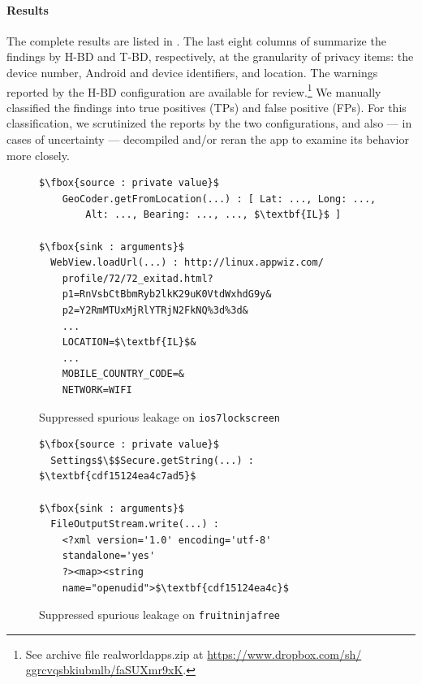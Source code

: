 \paragraph{Results} The complete results are listed in . The last eight columns of  summarize the findings by H-BD and T-BD, respectively, at the granularity of privacy items: the device number, Android and device identifiers, and location. 
%
%
The warnings reported by the H-BD configuration are available for review.\footnote{
	See archive file realworldapps.zip at \href{https://www.dropbox.com/sh/ggrcvqsbkiubmlb/faSUXmr9xK}{https://www.dropbox.com/sh/
	ggrcvqsbkiubmlb/faSUXmr9xK}.
}
%
We manually classified the findings into true positives (TPs) and false positive (FPs). For this classification, we scrutinized the reports by the two configurations, and also --- in cases of uncertainty --- decompiled and/or reran the app to examine its behavior more closely. 

\begin{figure}
\begin{minipage}[b]{0.95\columnwidth}
\begin{lstlisting}
$\fbox{source : private value}$
    GeoCoder.getFromLocation(...) : [ Lat: ..., Long: ..., 
	    Alt: ..., Bearing: ..., ..., $\textbf{IL}$ ] 
	    
$\fbox{sink : arguments}$
  WebView.loadUrl(...) : http://linux.appwiz.com/
    profile/72/72_exitad.html?
    p1=RnVsbCtBbmRyb2lkK29uK0VtdWxhdG9y&
    p2=Y2RmMTUxMjRlYTRjN2FkNQ%3d%3d&
    ...    
    LOCATION=$\textbf{IL}$&
    ...
    MOBILE_COUNTRY_CODE=&
    NETWORK=WIFI
\end{lstlisting}
\caption{\label{Fi:ios7}Suppressed spurious leakage on {\tt ios7lockscreen}}
\end{minipage}
\hfill
\begin{minipage}[b]{0.95\columnwidth}
\begin{lstlisting}
$\fbox{source : private value}$
  Settings$\$$Secure.getString(...) : $\textbf{cdf15124ea4c7ad5}$
  
$\fbox{sink : arguments}$
  FileOutputStream.write(...) : 
    <?xml version='1.0' encoding='utf-8' 
    standalone='yes' 
    ?><map><string 
    name="openudid">$\textbf{cdf15124ea4c}$
\end{lstlisting}
\caption{\label{Fi:fruitninja}Suppressed spurious leakage on {\tt fruitninjafree}}
\end{minipage}
\end{figure}

